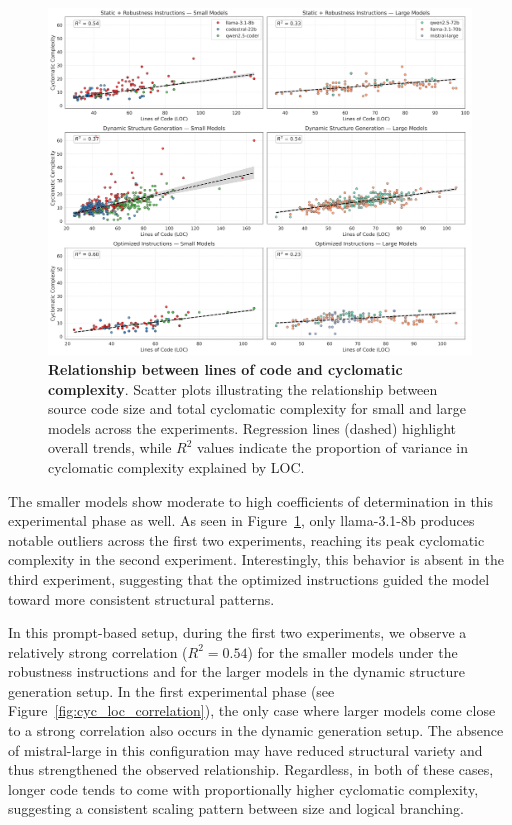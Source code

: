 \documentclass{DESSThesis}
\begin{document}
\begin{figure}[ht]
    \centering
    \includegraphics[width=\linewidth]{img/Results/Second Experimental Phase/Cyc_LOC_correlation.png}
    \caption[]{\textbf{Relationship between lines of code and cyclomatic complexity}. Scatter plots illustrating the relationship between source code size and total cyclomatic complexity for small and large models across the experiments. Regression lines (dashed) highlight overall trends, while $R^2$ values indicate the proportion of variance in cyclomatic complexity explained by LOC.}
    \label{fig:cyc_loc_correlation_second}
\end{figure}

\noindent The smaller models show moderate to high coefficients of determination in this experimental phase as well. As seen in Figure~\ref{fig:cyc_loc_correlation_second}, only llama-3.1-8b produces notable outliers across the first two experiments, reaching its peak cyclomatic complexity in the second experiment. Interestingly, this behavior is absent in the third experiment, suggesting that the optimized instructions guided the model toward more consistent structural patterns.

In this prompt-based setup, during the first two experiments, we observe a relatively strong correlation ($R^2=0.54$) for the smaller models under the robustness instructions and for the larger models in the dynamic structure generation setup. In the first experimental phase (see Figure~\ref{fig:cyc_loc_correlation}), the only case where larger models come close to a strong correlation also occurs in the dynamic generation setup. The absence of mistral-large in this configuration may have reduced structural variety and thus strengthened the observed relationship. Regardless, in both of these cases, longer code tends to come with proportionally higher cyclomatic complexity, suggesting a consistent scaling pattern between size and logical branching.
\end{document}
